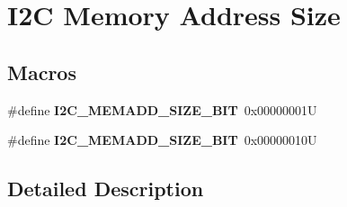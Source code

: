 \hypertarget{group___i2_c___memory___address___size}{}\section{I2C Memory Address Size}
\label{group___i2_c___memory___address___size}
\subsection*{Macros}
\begin{DoxyCompactItemize}
\item 
\mbox{\label{group___i2_c___memory___address___size_ga44007b689fa80deeab22820ad0b2dc6d}} 
\#define {\bfseries I2\+C\+\_\+\+M\+E\+M\+A\+D\+D\+\_\+\+S\+I\+Z\+E\+\_\+B\+IT}~0x00000001U
\item 
\mbox{\label{group___i2_c___memory___address___size_ga5b8c4b7d245fd7ab998acf2c7edd61a4}} 
\#define {\bfseries I2\+C\+\_\+\+M\+E\+M\+A\+D\+D\+\_\+\+S\+I\+Z\+E\+\_\+B\+IT}~0x00000010U
\end{DoxyCompactItemize}


\subsection{Detailed Description}
